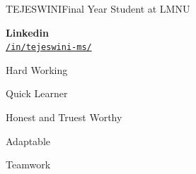 \documentclass{article}
\begin{document}
\begin{cv}[avatar]{TEJESWINI}{Final Year Student at LMNU}
\cvseparator[3]
\begin{cvitem}[Globe][4]
    \textbf{Linkedin}\\
    \href{https://www.linkedin.com/in/tejeswini-ms/}{\texttt{/in/tejeswini-ms/}}
\end{cvitem}



\begin{cvitem}
    Hard Working
\end{cvitem}

\cvseparator
\begin{cvitem}
   Quick Learner
\end{cvitem}

\cvseparator
\begin{cvitem}
    Honest and Truest Worthy
\end{cvitem}

\cvseparator
\begin{cvitem}
    Adaptable
\end{cvitem}

\cvseparator
\begin{cvitem}
    Teamwork
\end{cvitem}





\end{cv}
\end{document}
